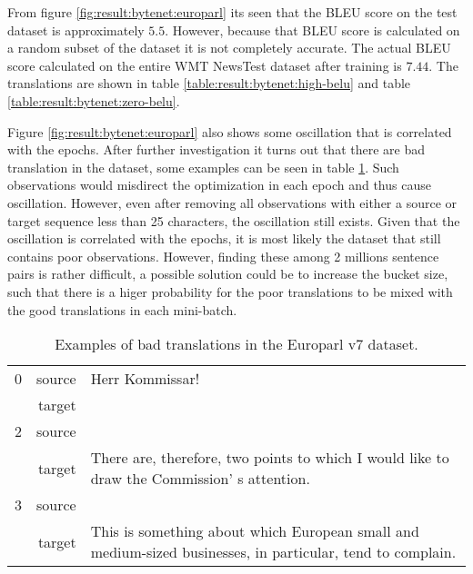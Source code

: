 From figure \ref{fig:result:bytenet:europarl} its seen that the BLEU score on the test dataset is approximately $5.5$. However, because that BLEU score is calculated on a random subset of the dataset it is not completely accurate. The actual BLEU score calculated on the entire WMT NewsTest dataset after training is $7.44$. The translations are shown in table \ref{table:result:bytenet:high-belu} and table \ref{table:result:bytenet:zero-belu}.

Figure \ref{fig:result:bytenet:europarl} also shows some oscillation that is correlated with the epochs. After further investigation it turns out that there are bad translation in the dataset, some examples can be seen in table \ref{table:result:bytenet:bad-translations}. Such observations would misdirect the optimization in each epoch and thus cause oscillation. However, even after removing all observations with either a source or target sequence less than 25 characters, the oscillation still exists. Given that the oscillation is correlated with the epochs, it is most likely the dataset that still contains poor observations. However, finding these among 2 millions sentence pairs is rather difficult, a possible solution could be to increase the bucket size, such that there is a higer probability for the poor translations to be mixed with the good translations in each mini-batch.

\begin{table}[h]
\centering
\begin{tabular}{l|r|p{10cm}}
0 & source & Herr Kommissar! \\[0.1cm]
  & target & \\[0.1cm] \hline
2 & source & \\[0.1cm]
  & target & There are, therefore, two points to which I would like to draw the Commission' s attention. \\[0.1cm]  \hline
3 & source & \\[0.1cm]
  & target & This is something about which European small and medium-sized businesses, in particular, tend to complain.
\end{tabular}
\caption{Examples of bad translations in the Europarl v7 dataset.}
\label{table:result:bytenet:bad-translations}
\end{table}

